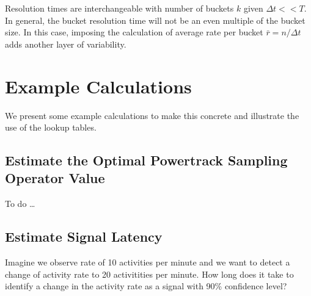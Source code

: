 \documentclass{article}
\begin{document}
Resolution times are interchangeable with number of buckets $k$ given $\Delta t << T$.  In general, the
bucket resolution time will not be an even multiple of the bucket size.  In this case, imposing the calculation of average rate per bucket $\bar{r} = n/\Delta t$ adds another layer of variability.

%
%
%

\section{Example Calculations} 

We present some example calculations to make this concrete and illustrate the use of the lookup tables.

\subsection{Estimate the Optimal Powertrack Sampling Operator Value} 

To do \ldots

\subsection{Estimate Signal Latency} 


Imagine we observe rate of 10 activities per minute and we want to detect a change of activity rate to 20 activitities per minute.  How long does it take to identify a change in the activity rate as a signal with 90\% confidence level?
\end{document}
